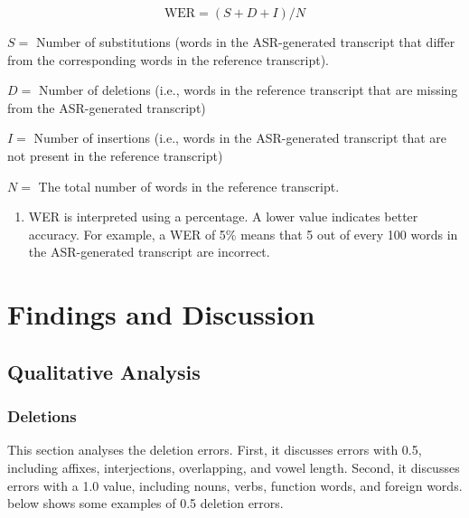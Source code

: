 \documentclass[english]{textolivre}
\begin{document}
\begin{itemize}
\begin{equation}\nonumber
    \text{WER} = (S + D + I) / N
\end{equation}

$S =$ Number of substitutions (words in the ASR-generated transcript that differ from the corresponding words in the reference transcript).

$D =$ Number of deletions (i.e., words in the reference transcript that are missing from the ASR-generated transcript)

$I =$ Number of insertions (i.e., words in the ASR-generated transcript that are not present in the reference transcript)

$N =$ The total number of words in the reference transcript.

	\begin{enumerate}[resume]
	\item WER is interpreted using a percentage. A lower value indicates better
	accuracy. For example, a WER of 5\% means that 5 out of every 100
	words in the ASR-generated transcript are incorrect.
	\end{enumerate}

\end{itemize}

\section{Findings and Discussion}\label{sec-findings-and-discussion}

\subsection{Qualitative Analysis}\label{subsec-Qualitative-Analysis}

\subsubsection{Deletions}\label{subsubsec-Deletions}

This section analyses the deletion errors. First, it discusses errors
with 0.5, including affixes, interjections, overlapping, and vowel
length. Second, it discusses errors with a 1.0 value, including nouns,
verbs, function words, and foreign words.  below shows some
examples of 0.5 deletion errors.
	
\end{document}
